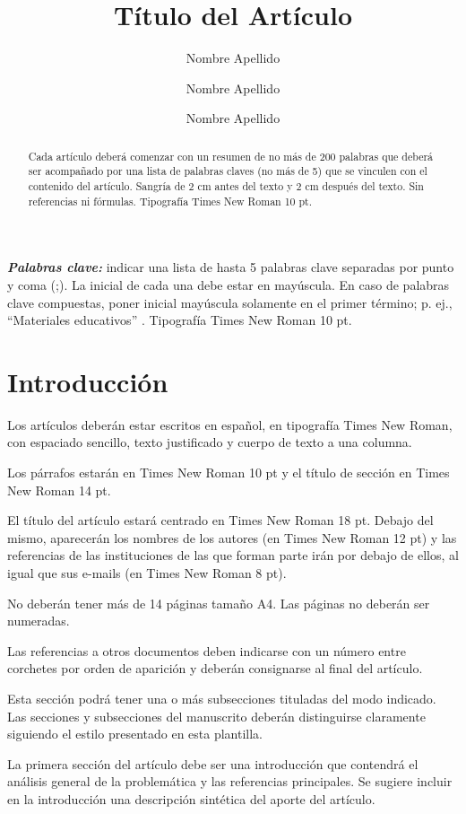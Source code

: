 \documentclass[a4paper,10pt]{article}
\title{Título del Artículo}
\author[1]{Nombre Apellido}
\author[2]{Nombre Apellido}
\author[1]{Nombre Apellido}
\affil[1]{Institución, Localidad, País}
\affil[2]{Institución, Localidad, País}
\affil[ ]{mail@servidor.com, mail2@servidor.com}
\date{}
\begin{document}
\maketitle
\thispagestyle{empty} %

\begin{abstract}
Cada artículo deberá comenzar con un resumen de no más de 200 palabras que deberá ser acompañado por una lista de palabras claves (no más de 5) que se vinculen con el contenido del artículo. Sangría de 2 cm antes del texto y 2 cm después del texto. Sin referencias ni fórmulas. Tipografía Times New Roman 10 pt.     
\end{abstract}
\textbf{\emph{Palabras clave:}} indicar una lista de hasta 5 palabras clave separadas por punto y coma (;). La inicial de cada una debe estar en mayúscula. En caso de palabras clave compuestas, poner inicial mayúscula solamente en el primer término; p. ej., ``Materiales educativos'' . Tipografía Times New Roman 10 pt. 

\section{Introducción}
Los artículos deberán estar escritos en español, en tipografía Times New Roman, con espaciado sencillo, texto justificado y cuerpo de texto a una columna.  

Los párrafos estarán en Times New Roman 10 pt  y  el título de sección en Times New Roman 14 pt.

El título del artículo estará centrado en Times New Roman 18 pt. Debajo del mismo, aparecerán los nombres de los autores (en Times New Roman 12 pt) y las referencias de las instituciones de las que forman parte irán por debajo de ellos, al igual que sus e-mails (en Times New Roman 8 pt).

No deberán tener más de 14 páginas tamaño A4. Las páginas no deberán ser numeradas.

Las referencias a otros documentos deben indicarse con un número entre corchetes por orden de aparición y deberán consignarse al final del artículo. 

Esta sección podrá tener una o más subsecciones tituladas del modo indicado. Las secciones y subsecciones del manuscrito deberán distinguirse claramente siguiendo el estilo presentado en esta plantilla. 

La primera sección del artículo debe ser una introducción que contendrá el análisis general de la problemática y las referencias principales. Se sugiere incluir en la introducción una descripción sintética del aporte del artículo.
\end{document}
